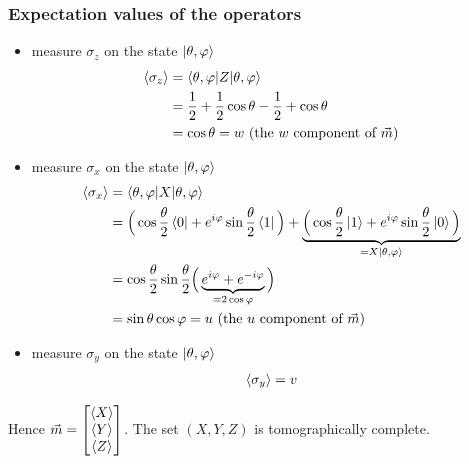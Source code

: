 \documentclass{article}
\begin{document}
\subsubsection{Expectation values of the operators}
\begin{itemize}[label=-]
    \item measure $\sigma_z$ on the state $\ket{\theta, \varphi}$
    \begin{equation}
        \begin{aligned}
            \braket{\sigma_z}
                & = \braket{\theta, \varphi|Z|\theta, \varphi} \\
                & = \frac{1}{2} + \frac{1}{2}\cos\theta - \frac{1}{2} + \cos\theta \\
                & = \cos \theta = w \text{  (the $w$ component of $\vec{m}$)}
        \end{aligned}
    \end{equation}
    \item measure $\sigma_x$ on the state $\ket{\theta, \varphi}$
    \begin{equation}
        \begin{aligned}
            \braket{\sigma_x}
                & = \braket{\theta, \varphi|X|\theta, \varphi} \\
                & = \Big(\cos\frac{\theta}{2}\bra{0}+e^{i\varphi}\sin\frac{\theta}{2}\bra{1}\Big)
                    + \underbrace{\Big(\cos\frac{\theta}{2}\ket{1}+e^{i\varphi}\sin\frac{\theta}{2}\ket{0}\Big)}_{=X\ket{\theta, \varphi}} \\
                & = \cos\frac{\theta}{2}\sin\frac{\theta}{2}
                    \Big(\underbrace{e^{i\varphi}+e^{-i\varphi}}_{=2\cos\varphi}\Big)\\
                & = \sin\theta\cos\varphi = u \text{  (the $u$ component of $\vec{m}$)}
        \end{aligned}
    \end{equation}
    \item measure $\sigma_y$ on the state $\ket{\theta, \varphi}$
    \begin{equation}
        \begin{aligned}
            \braket{\sigma_y} = v
        \end{aligned}
    \end{equation}
\end{itemize}

Hence $\vec{m} = \begin{bmatrix}
    \braket{X} \\ \braket{Y} \\ \braket{Z}
\end{bmatrix}$. The set $(X, Y, Z)$ is tomographically complete.
\end{document}
